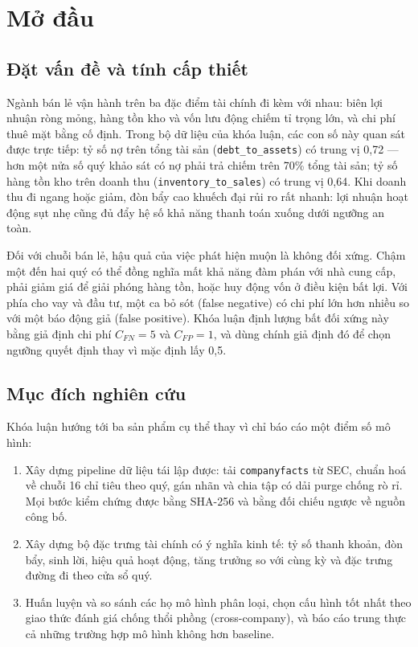 \chapter{Mở đầu}

\section{Đặt vấn đề và tính cấp thiết}

Ngành bán lẻ vận hành trên ba đặc điểm tài chính đi kèm với nhau: biên lợi nhuận ròng mỏng, hàng
tồn kho và vốn lưu động chiếm tỉ trọng lớn, và chi phí thuê mặt bằng cố định. Trong bộ dữ liệu của
khóa luận, các con số này quan sát được trực tiếp: tỷ số nợ trên tổng tài sản (\texttt{debt\_to\_assets})
có trung vị 0,72 — hơn một nửa số quý khảo sát có nợ phải trả chiếm trên 70\% tổng tài sản; tỷ số
hàng tồn kho trên doanh thu (\texttt{inventory\_to\_sales}) có trung vị 0,64. Khi doanh thu đi ngang
hoặc giảm, đòn bẩy cao khuếch đại rủi ro rất nhanh: lợi nhuận hoạt động sụt nhẹ cũng đủ đẩy hệ số
khả năng thanh toán xuống dưới ngưỡng an toàn.

Đối với chuỗi bán lẻ, hậu quả của việc phát hiện muộn là không đối xứng. Chậm một đến hai quý có
thể đồng nghĩa mất khả năng đàm phán với nhà cung cấp, phải giảm giá để giải phóng hàng tồn, hoặc
huy động vốn ở điều kiện bất lợi. Với phía cho vay và đầu tư, một ca bỏ sót (false negative) có chi
phí lớn hơn nhiều so với một báo động giả (false positive). Khóa luận định lượng bất đối xứng này
bằng giả định chi phí $C_{FN} = 5$ và $C_{FP} = 1$, và dùng chính giả định đó để chọn ngưỡng quyết
định thay vì mặc định lấy 0,5.

\section{Mục đích nghiên cứu}

Khóa luận hướng tới ba sản phẩm cụ thể thay vì chỉ báo cáo một điểm số mô hình:

\begin{enumerate}
\item Xây dựng pipeline dữ liệu tái lập được: tải \texttt{companyfacts} từ SEC, chuẩn hoá về chuỗi
      16 chỉ tiêu theo quý, gán nhãn và chia tập có dải purge chống rò rỉ. Mọi bước kiểm chứng được
      bằng SHA-256 và bằng đối chiếu ngược về nguồn công bố.
\item Xây dựng bộ đặc trưng tài chính có ý nghĩa kinh tế: tỷ số thanh khoản, đòn bẩy, sinh lời,
      hiệu quả hoạt động, tăng trưởng so với cùng kỳ và đặc trưng đường đi theo cửa sổ quý.
\item Huấn luyện và so sánh các họ mô hình phân loại, chọn cấu hình tốt nhất theo giao thức đánh
      giá chống thổi phồng (cross-company), và báo cáo trung thực cả những trường hợp mô hình không
      hơn baseline.
\end{enumerate}

